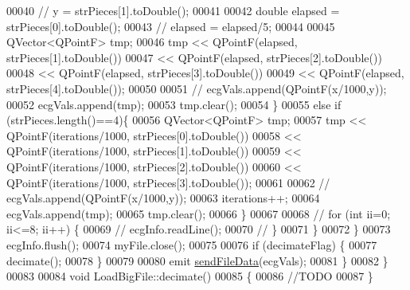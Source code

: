 \begin{DoxyCode}
00040                     \textcolor{comment}{//                y = strPieces[1].toDouble();}
00041 
00042                     \textcolor{keywordtype}{double} elapsed = strPieces[0].toDouble();
00043                     \textcolor{comment}{//    elapsed = elapsed/5;}
00044 
00045                     QVector<QPointF> tmp;
00046                     tmp << QPointF(elapsed, strPieces[1].toDouble())
00047                                     << QPointF(elapsed, strPieces[2].toDouble())
00048                                     << QPointF(elapsed, strPieces[3].toDouble())
00049                                     << QPointF(elapsed, strPieces[4].toDouble());
00050 
00051                     \textcolor{comment}{//                ecgVals.append(QPointF(x/1000,y));}
00052                     ecgVals.append(tmp);
00053                     tmp.clear();
00054                 \}
00055                 \textcolor{keywordflow}{else} \textcolor{keywordflow}{if} (strPieces.length()==4)\{
00056                     QVector<QPointF> tmp;
00057                     tmp << QPointF(iterations/1000, strPieces[0].toDouble())
00058                                                     << QPointF(iterations/1000, strPieces[1].toDouble())
00059                                                     << QPointF(iterations/1000, strPieces[2].toDouble())
00060                                                     << QPointF(iterations/1000, strPieces[3].toDouble());
00061 
00062                     \textcolor{comment}{//                ecgVals.append(QPointF(x/1000,y));}
00063                     iterations++;
00064                     ecgVals.append(tmp);
00065                     tmp.clear();
00066                 \}
00067 
00068                 \textcolor{comment}{//    for (int ii=0; ii<=8; ii++) \{}
00069                 \textcolor{comment}{//        ecgInfo.readLine();}
00070                 \textcolor{comment}{//    \}}
00071             \}
00072         \}
00073         ecgInfo.flush();
00074         myFile.close();
00075 
00076         \textcolor{keywordflow}{if} (decimateFlag) \{
00077             decimate();
00078         \}
00079 
00080         emit \hyperlink{classLoadBigFile_ad0c00cd9faeeb4e03a94f530152c69d9}{sendFileData}(ecgVals);
00081     \}
00082 \}
00083 
00084 \textcolor{keywordtype}{void} LoadBigFile::decimate()
00085 \{
00086     \textcolor{comment}{//TODO}
00087 \}
\end{DoxyCode}
